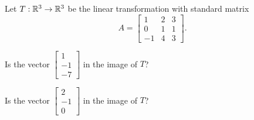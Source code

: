

\endedxproblem



Let $T: \mathbb R^3 \rightarrow \mathbb R^3$ be the linear transformation with standard matrix 
\[ A = \left[\begin{array}{ccc} 1 & 2 & 3 \\ 0 & 1 & 1 \\ -1 & 4 & 3  \end{array} \right]. \]

Is the vector $\left[\begin{array}{c} 1 \\ -1  \\ -7 \end{array} \right]$ in the image of $T$?



Is the vector $\left[\begin{array}{c} 2 \\ -1  \\ 0 \end{array} \right]$ in the image of $T$?



